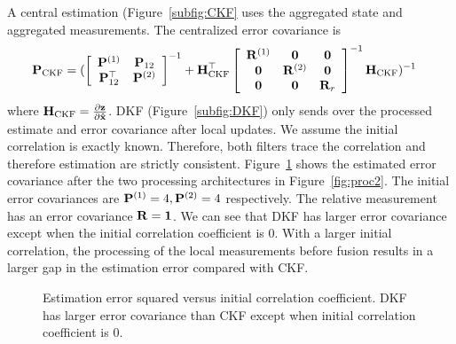 A central estimation (Figure~\ref{subfig:CKF} uses the aggregated state and aggregated measurements. The centralized error covariance is 
\begin{equation}
\begin{split}
{\bf P}_\text{CKF}&=(\left[
             \begin{array}{cc}
               {\bf P}^{(1)} & {\bf P}_{12} \\
               {\bf P}_{12}^\top & {\bf P}^{(2)} \\
             \end{array}
           \right]^{-1}+{\bf H}_\text{CKF}^\top\left[
                                        \begin{array}{ccc}
                                          {\bf R}^{(1)} & {\bf 0} & {\bf 0} \\
                                          {\bf 0} & {\bf R}^{(2)} & {\bf 0} \\
                                          {\bf 0} & {\bf 0} & {\bf R}_r \\
                                        \end{array}
                                      \right]^{-1}{\bf H}_\text{CKF}
)^{-1}
\end{split}
\end{equation}
where ${\bf H}_\text{CKF}=\frac{\partial{\bf z}}{\partial{\bf\hat x}}$. DKF (Figure~\ref{subfig:DKF}) only sends over the processed estimate and error covariance after local updates. We assume the initial correlation is exactly known. Therefore, both filters trace the correlation and therefore estimation are strictly consistent. 
Figure~\ref{fig:eg1-1} shows the estimated error covariance after the two processing architectures in Figure~\ref{fig:proc2}. The initial error covariances are ${\bf P}^{(1)}=4,{\bf P}^{(2)}=4$ respectively. The relative measurement has an error covariance $\bf R=1$. We can see that DKF has larger error covariance except when the initial correlation coefficient is 0. With a larger initial correlation, the processing of the local measurements before fusion results in a larger gap in the estimation error compared with CKF. 

\begin{figure}[htbp]
\begin{center}
\caption{Estimation error squared versus initial correlation coefficient. DKF has larger error covariance than CKF except when initial correlation coefficient is 0.}
\label{fig:eg1-1}
\end{center}
\end{figure}

